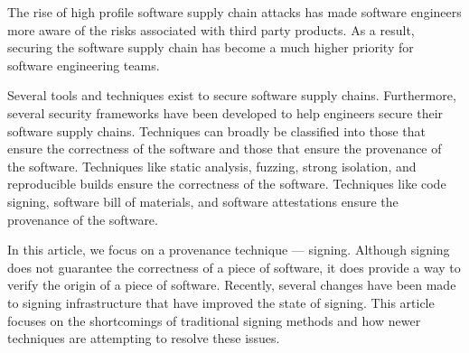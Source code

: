 \documentclass{IEEEcsmagTechrxiv}
\begin{document}
	The rise of high profile software supply chain attacks has made software engineers more aware of the risks associated with third party products.
	As a result, securing the software supply chain has become a much higher priority for software engineering teams.

	Several tools and techniques exist to secure software supply chains.
	Furthermore, several security frameworks have been developed to help engineers secure their software supply chains.
	Techniques can broadly be classified into those that ensure the correctness of the software and those that ensure the provenance of the software.
	Techniques like static analysis, fuzzing, strong isolation, and reproducible builds ensure the correctness of the software.
	Techniques like code signing, software bill of materials, and software attestations ensure the provenance of the software.

	In this article, we focus on a provenance technique --- signing.
	Although signing does not guarantee the correctness of a piece of software, it does provide a way to verify the origin of a piece of software.
	Recently, several changes have been made to signing infrastructure that have improved the state of signing.
	This article focuses on the shortcomings of traditional signing methods and how newer techniques are attempting to resolve these issues.

\fi


\end{document}
